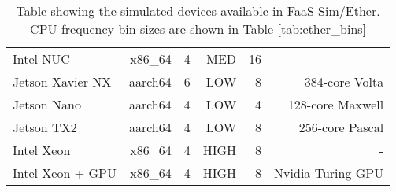 \begin{table}[]
\begin{tabular}{lrrrrr}
Intel NUC                                                            & x86\_64                                                     & 4                                                            & MED                                                         & 16                                                            & -                       \\
Jetson Xavier NX                                                             & aarch64                                                     & 6                                                            & LOW                                                         & 8                                                             & 384-core Volta          \\
Jetson Nano                                                           & aarch64                                                     & 4                                                            & LOW                                                         & 4                                                             & 128-core Maxwell        \\
Jetson TX2                                                           & aarch64                                                     & 4                                                            & LOW                                                         & 8                                                             & 256-core Pascal        \\
Intel Xeon                                                           & x86\_64                                                     & 4                                                            & HIGH                                                        & 8                                                             & -                       \\
Intel Xeon + GPU                                                      & x86\_64                                                     & 4                                                            & HIGH                                                        & 8                                                             & Nvidia Turing GPU       \\ \hline
\end{tabular}
\caption{Table showing the simulated devices available in FaaS-Sim/Ether. CPU frequency bin sizes are shown in Table \ref{tab:ether_bins}}
\label{tab:ether_devices}
\end{table}

